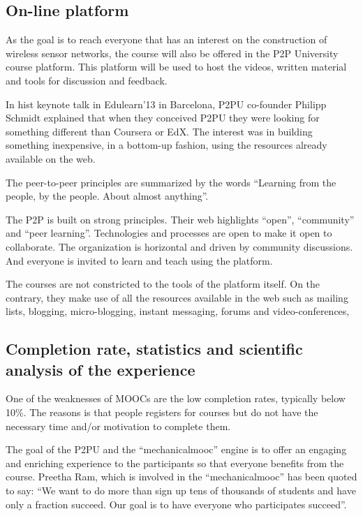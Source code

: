 \documentclass[a4paper,oneside]{book}   %
\begin{document}
\subsection{On-line platform}

As the goal is to reach everyone that has an interest on the construction of wireless sensor networks, the course will also be offered in the P2P University course platform.
This platform will be used to host the videos, written material and tools for discussion and feedback.

In hist keynote talk in Edulearn'13 in Barcelona, P2PU co-founder Philipp Schmidt explained that when they conceived P2PU they were looking for something different than Coursera or EdX.
The interest was in building something inexpensive, in a bottom-up fashion, using the resources already available on the web.

The peer-to-peer principles are summarized by the words ``Learning from the people, by the people. About almost anything''.

The P2P is built on strong principles. 
Their web highlights ``open'', ``community'' and ``peer learning''.
Technologies and processes are open to make it open to collaborate.
The organization is horizontal and driven by community discussions.
And everyone is invited to learn and teach using the platform.

The courses are not constricted to the tools of the platform itself. 
On the contrary, they make use of all the resources available in the web such as mailing lists, blogging, micro-blogging, instant messaging, forums and video-conferences, 

\subsection{Completion rate, statistics and scientific analysis of the experience}

One of the weaknesses of MOOCs are the low completion rates, typically below 10\%.
The reasons is that people registers for courses but do not have the necessary time and/or motivation to complete them.

The goal of the P2PU and the ``mechanicalmooc'' engine is to offer an engaging and enriching experience to the participants so that everyone benefits from the course.
Preetha Ram, which is involved in the ``mechanicalmooc'' has been quoted to say: ``We want to do more than sign up tens of thousands of students and have only a fraction succeed. Our goal is to have everyone who participates succeed''.
\end{document}

